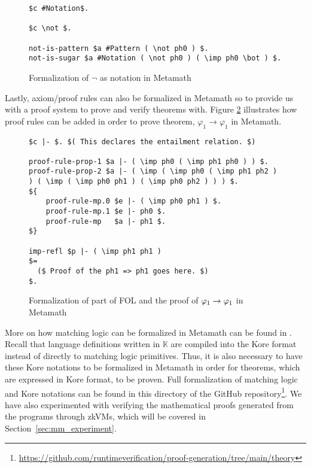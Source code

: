 \documentclass{article}
\theoremstyle{plain}
\theoremstyle{definition}
\newcommand{\imp}{\to}
\newcommand{\K}{$\mathbb{K}$\xspace}
\begin{document}
\begin{figure}[!h]
\begin{lstlisting}[language=Metamath]
$c #Notation$.

$c \not $.

not-is-pattern $a #Pattern ( \not ph0 ) $.
not-is-sugar $a #Notation ( \not ph0 ) ( \imp ph0 \bot ) $.
\end{lstlisting}
\caption{Formalization of $\neg$ as notation in Metamath}
\label{fig:mm_not_as_notation}
\end{figure}

Lastly, axiom/proof rules can also be formalized in Metamath so to provide us with a proof system to prove and verify theorems with. Figure \ref{fig:mm_fol} illustrates how proof rules can be added in order to prove theorem, $\varphi_1 \imp \varphi_1$ in Metamath.

\begin{figure}[!h]
\begin{lstlisting}[language=Metamath]
$c |- $. $( This declares the entailment relation. $)

proof-rule-prop-1 $a |- ( \imp ph0 ( \imp ph1 ph0 ) ) $.
proof-rule-prop-2 $a |- ( \imp ( \imp ph0 ( \imp ph1 ph2 ) ) ( \imp ( \imp ph0 ph1 ) ( \imp ph0 ph2 ) ) ) $.
${
    proof-rule-mp.0 $e |- ( \imp ph0 ph1 ) $.
    proof-rule-mp.1 $e |- ph0 $.
    proof-rule-mp   $a |- ph1 $.
$}

imp-refl $p |- ( \imp ph1 ph1 )
$=
  ($ Proof of the ph1 => ph1 goes here. $)
$.
\end{lstlisting}
\caption{Formalization of part of FOL and the proof of $\varphi\sb 1 \imp \varphi\sb 1$ in Metamath}
\label{fig:mm_fol}
\end{figure}

More on how matching logic can be formalized in Metamath can be found in \cite{LCT23}. Recall that language definitions written in \K are compiled into the Kore format instead of directly to matching logic primitives. Thus, it is also necessary to have these Kore notations to be formalized in Metamath in order for theorems, which are expressed in Kore format, to be proven. Full formalization of matching logic and Kore notations can be found in this directory of the GitHub repository\footnote{\url{https://github.com/runtimeverification/proof-generation/tree/main/theory}}. We have also experimented with verifying the mathematical proofs generated from the programs through zkVMs, which will be covered in Section~\ref{sec:mm_experiment}.
\end{document}

